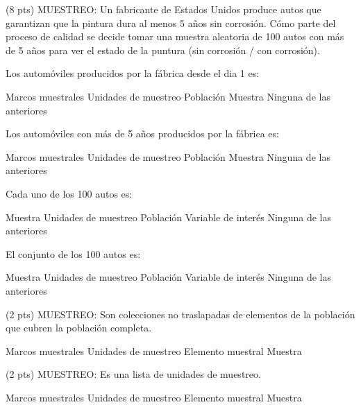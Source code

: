 \documentclass[addpoints]{exam}
\theoremstyle{mytheor}
\begin{document}
  \begin{questions}
  
  \question (8 pts) MUESTREO: Un fabricante de Estados Unidos produce autos que garantizan que la pintura dura al menos 5 años sin corrosión. Cómo parte del proceso de calidad se decide tomar una muestra aleatoria de 100 autos con más de 5 años para ver el estado de la puntura (sin corrosión / con corrosión).

Los automóviles producidos por la fábrica desde el dia 1 es:

\begin{checkboxes}
  \choice Marcos muestrales
  \choice Unidades de muestreo
  \choice Población
  \choice Muestra
  \choice Ninguna de las anteriores
\end{checkboxes}
  
Los automóviles con más de 5 años producidos por la fábrica es:

\begin{checkboxes}
  \choice Marcos muestrales
  \choice Unidades de muestreo
  \choice Población
  \choice Muestra
  \choice Ninguna de las anteriores
\end{checkboxes}


Cada uno de los 100 autos es:
\begin{checkboxes}
  \choice Muestra
  \choice Unidades de muestreo
  \choice Población
  \choice Variable de interés
  \choice Ninguna de las anteriores
\end{checkboxes}

El conjunto de los 100 autos es:
\begin{checkboxes}
  \choice Muestra
  \choice Unidades de muestreo
  \choice Población
  \choice Variable de interés
  \choice Ninguna de las anteriores
\end{checkboxes}

\question (2 pts) MUESTREO: Son colecciones no traslapadas de elementos de la población que cubren la población completa.
  
  \begin{checkboxes}
  \choice Marcos muestrales
  \choice Unidades de muestreo
  \choice Elemento muestral
  \choice Muestra
  \end{checkboxes}
  
\question (2 pts) MUESTREO: Es una lista de unidades de muestreo.
  
  \begin{checkboxes}
  \choice Marcos muestrales
  \choice Unidades de muestreo
  \choice Elemento muestral
  \choice Muestra
  \end{checkboxes}
  

\end{questions}
\end{document}
